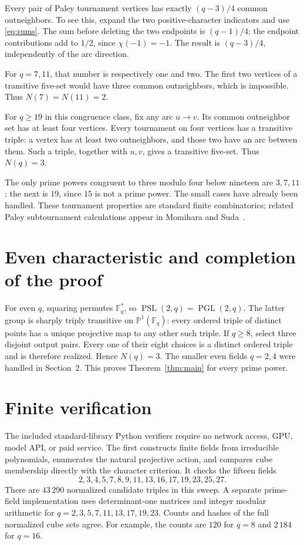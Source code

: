 \documentclass[11pt,a4paper]{article}
\DeclareMathOperator{\PSL}{PSL}
\DeclareMathOperator{\PGL}{PGL}
\newcommand{\F}{\mathbb{F}}
\newcommand{\PP}{\mathbb{P}}
\begin{document}
Every pair of Paley tournament vertices has exactly $(q-3)/4$ common
outneighbors. To see this, expand the two positive-character indicators
and use \eqref{eq:sums}. The sum before deleting the two endpoints is
$(q-1)/4$; the endpoint contributions add to $1/2$, since $\chi(-1)=-1$.
The result is $(q-3)/4$, independently of the arc direction.

For $q=7,11$, that number is respectively one and two. The first two
vertices of a transitive five-set would have three common outneighbors,
which is impossible. Thus $N(7)=N(11)=2$.

For $q\ge19$ in this congruence class, fix any arc $u\to v$.
Its common outneighbor set has at least four vertices. Every tournament
on four vertices has a transitive triple: a vertex has at least two
outneighbors, and those two have an arc between them. Such a triple,
together with $u,v$, gives a transitive five-set. Thus $N(q)=3$.

The only prime powers congruent to three modulo four below nineteen are
$3,7,11$; the next is $19$, since $15$ is not a prime power.
The small cases have already been handled. These tournament properties
are standard finite combinatorics; related Paley subtournament calculations
appear in Momihara and Suda~\cite{ms}.

\section{Even characteristic and completion of the proof}
For even $q$, squaring permutes $\F_q^*$, so $\PSL(2,q)=\PGL(2,q)$.
The latter group is sharply triply transitive on $\PP^1(\F_q)$: every
ordered triple of distinct points has a unique projective map to any
other such triple. If $q\ge8$, select three disjoint output pairs.
Every one of their eight choices is a distinct ordered triple and is
therefore realized. Hence $N(q)=3$. The smaller even fields $q=2,4$
were handled in Section~2. This proves Theorem~\ref{thm:main} for every prime power.

\section{Finite verification}
The included standard-library Python verifiers require no network access,
GPU, model API, or paid service. The first constructs finite fields from
irreducible polynomials, enumerates the natural projective action, and
compares cube membership directly with the character criterion.
It checks the fifteen fields
\[
2,3,4,5,7,8,9,11,13,16,17,19,23,25,27.
\]
There are $43\,290$ normalized candidate triples in this sweep. A separate
prime-field implementation uses determinant-one matrices and integer
modular arithmetic for $q=2,3,5,7,11,13,17,19,23$. Counts and hashes of
the full normalized cube sets agree. For example, the counts are $120$
for $q=8$ and $2\,184$ for $q=16$.
\end{document}
